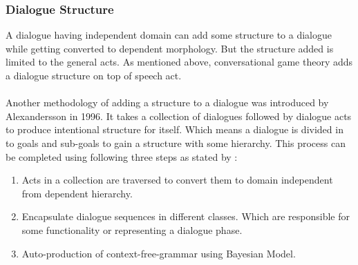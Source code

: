 \subsubsection*{Dialogue Structure}
A dialogue having independent domain can add some structure to a dialogue while getting converted to dependent morphology. But the structure added is limited to the general acts. As mentioned above, conversational game theory adds a dialogue structure on top of speech act.
\\~\\
Another methodology of adding a structure to a dialogue was introduced by Alexandersson in 1996. It takes a collection of dialogues followed by dialogue acts to produce intentional structure for itself. Which means a dialogue is divided in to goals and sub-goals to gain a structure with some hierarchy. This process can be completed using following three steps as stated by \cite{dialoguemanagementsystems}\cite{automaticacquisition}: 
\begin{enumerate}
    \item Acts in a collection are traversed to convert them to domain independent from dependent hierarchy.
    \item Encapsulate dialogue sequences in different classes. Which are responsible for some functionality or representing a dialogue phase.
    \item Auto-production of context-free-grammar using Bayesian Model.
\end{enumerate} 

